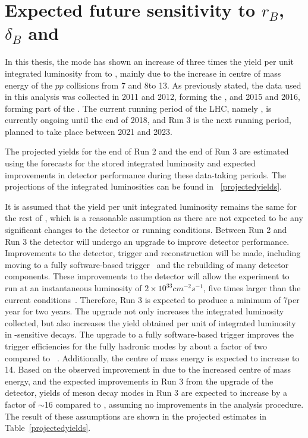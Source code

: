 \section{Expected future sensitivity to $r_B$, $\delta_B$ and \Pgamma}
\label{sec:interpretation:futuresensitivity}

In this thesis, the \btodkst mode has shown an increase of three times the yield per unit integrated luminosity from \runone to \runtwo, mainly due to the increase in centre of mass energy of the $pp$ collisions from 7 and 8\tev to 13\tev. As previously stated, the data used in this analysis was collected in 2011 and 2012, forming the \runone \dataset, and 2015 and 2016, forming part of the \runtwo \dataset. The current running period of the LHC, namely \runtwo, is currently ongoing until the end of 2018, and Run 3 is the next running period, planned to take place between 2021 and 2023.

The projected yields for the end of Run 2 and the end of Run 3 are estimated using the forecasts for the stored integrated luminosity and expected improvements in detector performance during these data-taking periods. The projections of the integrated luminosities can be found in \tab~\ref{projectedyields}. 

It is assumed that the yield per unit integrated luminosity remains the same for the rest of \runtwo, which is a reasonable assumption as there are not expected to be any significant changes to the detector or running conditions. Between Run 2 and Run 3 the detector will undergo an upgrade to improve detector performance. Improvements to the detector, trigger and reconstruction will be made, including moving to a fully software-based trigger~\cite{CERN-LHCC-2014-016} and the rebuilding of many detector components. These improvements to the detector will allow the experiment to run at an instantaneous luminosity of $2 \times 10^{33} cm^{-2}s^{-1}$, five times larger than the current conditions~\cite{CERN-LHCC-2014-016}. Therefore, Run 3 is expected to produce a minimum of 7\invfb per year for two years. The upgrade not only increases the integrated luminosity collected, but also increases the yield obtained per unit of integrated luminosity in \Pgamma-sensitive decays. The upgrade to a fully software-based trigger improves the trigger efficiencies for the fully hadronic modes by about a factor of two compared to \runone~\cite{CERN-LHCC-2014-016}. Additionally, the centre of mass energy is expected to increase to 14\tev. Based on the observed improvement in \runtwo due to the increased centre of mass energy, and the expected improvements in Run 3 from the upgrade of the detector, yields of \B meson decay modes in Run 3 are expected to increase by a factor of $\sim$16 compared to \runone, assuming no improvements in the analysis procedure. The result of these assumptions are shown in the projected estimates in Table~\ref{projectedyields}.

